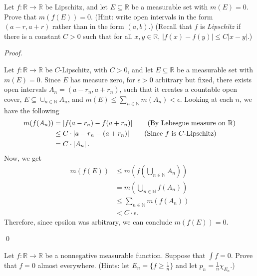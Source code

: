 \documentclass[12pt]{article}
\newenvironment{problem}[2][Problem]{\begin{trivlist}
\item[\hskip \labelsep {\bfseries #1}\hskip \labelsep {\bfseries
#2.}]}{\end{trivlist}}
\newenvironment{sol}
    {\emph{Proof.}
    }
    {
    \qed
    }
\begin{document}
\begin{problem}{3}
Let $f : \mathbb{R} \to \mathbb{R}$ be Lipschitz, and let $E \subseteq \mathbb{R}$ be a measurable set with $m(E) = 0$. Prove that $m(f(E)) = 0$. (Hint: write open intervals in the form $(a - r, a + r)$ rather than in the form $(a,b)$.) (Recall that $f$ is \textit{Lipschitz} if there is a constant $C > 0$ such that for all $x,y \in \mathbb{R}$, $\left| f(x) - f(y) \right| \leq C \left| x - y \right|$.)
\end{problem}

\begin{sol}
  Let $f : \mathbb{R} \to \mathbb{R}$ be $C$-Lipschitz, with $C > 0$, and let $E \subseteq \mathbb{R}$ be a measurable set with $m(E) = 0$. Since $E$ has measure zero, for $\epsilon > 0$ arbitrary but fixed, there exists open intervals $A_n = (a - r_n, a + r_n)$, such that it creates a countable open cover, $E \subseteq \cup_{n \in \mathbb{N}}A_n$, and $m(E) \leq \sum_{n \in \mathbb{N}}m(A_n) < \epsilon$. Looking at each $n$, we have the following
  \begin{align*}
    m(f(A_n)) &= \left| f(a-r_n) - f(a+r_n) \right| \tag*{(By Lebesgue measure on $\mathbb{R}$)}\\
    &\leq C \cdot \left| a - r_n - (a + r_n) \right| \tag*{(Since $f$ is $C$-Lipschitz)} \\
    &= C \cdot \left| A_n \right|. 
  \end{align*}
  Now, we get
  \begin{align*}
    m(f(E)) &\leq m\left( f \left( \bigcup_{n \in \mathbb{N}}A_n \right) \right) \tag*{(By monotonicity)} \\
    &= m \left( \bigcup_{n \in \mathbb{N}} f(A_n) \right) \tag*{(By continuity of $f$)} \\
    &\leq \sum_{n \in \mathbb{N}} m(f(A_n)) \tag*{(By subadditivity and $C$-Lipschitz property of $f$)} \\
    &< C \cdot \epsilon.
  \end{align*}
  \hspace{1em} Therefore, since epsilon was arbitrary, we can conclude $m(f(E)) = 0$.
\end{sol}

\begin{problem}{4}
Let $f : \mathbb{R} \to \mathbb{R}$ be a nonnegative measurable function. Suppose that $\int f = 0$. Prove that $f = 0$ almost everywhere. (Hints: let $E_n = \{f \geq \frac{1}{n}\}$ and let $p_n = \frac{1}{n} \chi_{E_n}$.)
\end{problem}
\end{document}
